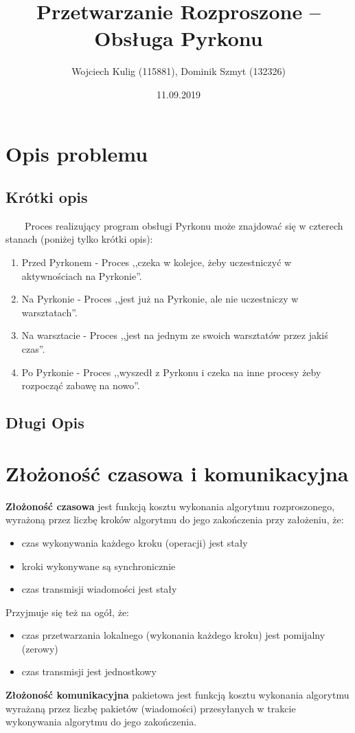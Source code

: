 \documentclass[11pt]{article}
\title{Przetwarzanie Rozproszone -- Obsługa Pyrkonu}
\author{Wojciech Kulig (115881), Dominik Szmyt (132326)}
\date{11.09.2019}
\begin{document}
\maketitle

\section{Opis problemu}

\subsection{Krótki opis}
~~~~Proces realizujący program obsługi Pyrkonu może znajdować się w czterech stanach (poniżej tylko krótki opis):
\begin{enumerate}
\item Przed Pyrkonem - Proces ,,czeka w kolejce, żeby uczestniczyć w aktywnościach na Pyrkonie''.
\item Na Pyrkonie - Proces ,,jest już na Pyrkonie, ale nie uczestniczy w warsztatach''.
\item Na warsztacie - Proces ,,jest na jednym ze swoich warsztatów przez jakiś czas''.
\item Po Pyrkonie - Proces ,,wyszedł z Pyrkonu i czeka na inne procesy żeby rozpocząć zabawę na nowo''.
\end{enumerate}

\subsection{Długi Opis} 

\section{Złożoność czasowa i komunikacyjna}
\textbf{Złożoność czasowa} jest funkcją kosztu wykonania algorytmu rozproszonego, wyrażoną przez liczbę kroków algorytmu do jego zakończenia przy założeniu, że:
\begin{itemize}
\item czas wykonywania każdego kroku (operacji) jest stały
\item kroki wykonywane są synchronicznie
\item czas transmisji wiadomości jest stały
\end{itemize}
Przyjmuje się też na ogół, że:
\begin{itemize}
\item czas przetwarzania lokalnego (wykonania każdego kroku) jest pomijalny (zerowy)
\item czas transmisji jest jednostkowy
\end{itemize}
\medskip 
\textbf{Złożoność komunikacyjna} pakietowa jest funkcją kosztu wykonania algorytmu wyrażaną przez liczbę pakietów (wiadomości) przesyłanych w trakcie wykonywania algorytmu do jego zakończenia.
\end{document}
